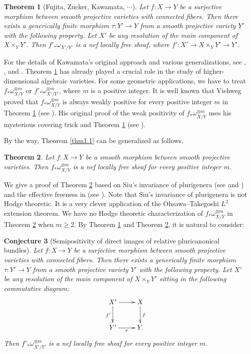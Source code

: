 \documentclass[12pt,twoside]{amsart}
\newtheorem{thm}{Theorem}[section]
\newtheorem{conj}[thm]{Conjecture}
\theoremstyle{definition}
\begin{document}
\begin{thm}[Fujita, Zucker, Kawamata, $\cdots$]
\label{thm1.3} Let $f:X\to Y$ be a surjective morphism between 
smooth projective varieties with connected fibers. 
Then there exists a generically finite morphism $\tau:Y'\to Y$ from 
a smooth projective variety $Y'$ with 
the following property. 
Let $X'$ be any resolution of the main component of $X\times _Y Y'$. 
Then $f'_*\omega_{X'/Y'}$ is a nef locally free sheaf, 
where $f': X'\to X\times _Y Y'\to Y'$. 
\end{thm}
For the details of Kawamata's original approach and 
various generalizations, see \cite[Theorems 3.1, 3.4, and 
3.9]{fujino-higher}, 
\cite[Theorem 1.1 and Theorem 1.3]{fujino-fujisawa}, 
and \cite[Corollary 2, Theorem 2, and 
Theorem 3]{fujino-fujisawa-saito}.
Theorem \ref{thm1.3} has already played a crucial role 
in the study of higher-dimensional algebraic varieties. 
For some geometric applications, we have to 
treat $f_*\omega^{\otimes m}_{X/Y}$ or 
$f'_*\omega^{\otimes m}_{X'/Y'}$, where $m$ is a positive integer. 
It is well known that Viehweg proved that 
$f_*\omega^{\otimes m}_{X/Y}$ is always 
weakly positive 
for every positive integer $m$ 
in Theorem \ref{thm1.3} (see \cite[Theorem III]{viehweg}). 
His original 
proof of the weak positivity of $f_*\omega^{\otimes m}_{X/Y}$ 
uses his mysterious covering trick and Theorem \ref{thm1.3} 
(see \cite[\S 5]{viehweg}). 

By the way, Theorem \ref{thm1.1} can be generalized as follows. 
\begin{thm}\label{thm1.4}
Let $f:X\to Y$ be a smooth morphism between smooth 
projective varieties. 
Then $f_*\omega^{\otimes m}_{X/Y}$ is a nef 
locally free sheaf for every positive integer $m$. 
\end{thm}

We give a proof of Theorem \ref{thm1.4} based on Siu's invariance of 
plurigenera (see \cite[Corollary 0.2]{siu} and \cite[Theorem 1]{paun}) 
and the effective freeness in \cite{popa-schnell} 
(see \cite[Theorem 1.4]{popa-schnell}). 
Note that Siu's invariance of plurigenera is not Hodge theoretic. 
It is a very 
clever application of the Ohsawa--Takegoshi $L^2$ extension theorem. 
We have no Hodge theoretic characterization of $f_*\omega^{\otimes m}_{X/Y}$ 
in Theorem \ref{thm1.4} when $m\geq 2$. 
By Theorem \ref{thm1.3} and Theorem \ref{thm1.4}, 
it is natural to consider: 

\begin{conj}[Semipositivity of direct images of relative pluricanonical 
bundles]\label{conj1.5}
Let $f:X\to Y$ be a surjective morphism between 
smooth projective varieties with connected fibers. 
Then there exists a generically finite morphism 
$\tau:Y'\to Y$ from a smooth projective variety $Y'$ 
with the following property. 
Let $X'$ be any resolution of the main component of $X\times _Y Y'$ 
sitting in the following commutative diagram: 
$$
\xymatrix{X' \ar[r]\ar[d]_{f'}& X\ar[d]^f\\
Y'\ar[r]_{\tau} &Y. 
}
$$ 
Then $f'_*\omega^{\otimes m}_{X'/Y'}$ is a nef 
locally free sheaf for every positive integer $m$. 
\end{conj}
\end{document}
